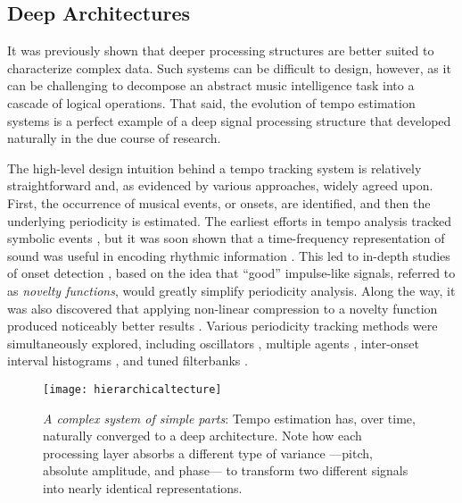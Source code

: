 \subsection{Deep Architectures}
\label{subsec:deep_architectures}

It was previously shown that deeper processing structures are better suited to characterize complex data.
Such systems can be difficult to design, however, as it can be challenging to decompose an abstract music intelligence task into a cascade of logical operations.
That said, the evolution of tempo estimation systems is a perfect example of a deep signal processing structure that developed naturally in the due course of research.

The high-level design intuition behind a tempo tracking system is relatively straightforward and, as evidenced by various approaches, widely agreed upon.
First, the occurrence of musical events, or onsets, are identified, and then the underlying periodicity is estimated.
The earliest efforts in tempo analysis tracked symbolic events \cite{Dannenberg1984}, but it was soon shown that a time-frequency representation of sound was useful in encoding rhythmic information \cite{Scheirer1998}.
This led to in-depth studies of onset detection \cite{Bello2005}, based on the idea that ``good'' impulse-like signals, referred to as \emph{novelty functions}, would greatly simplify periodicity analysis.
Along the way, it was also discovered that applying non-linear compression to a novelty function produced noticeably better results \cite{Klapuri2006}.
Various periodicity tracking methods were simultaneously explored, including oscillators \cite{Large1994}, multiple agents \cite{Goto1995}, inter-onset interval histograms \cite{Dixon2007}, and tuned filterbanks \cite{Grosche2011}.

\begin{figure}
\begin{centering}
\texttt{[image: hierarchicaltecture]}
\caption{\emph{A complex system of simple parts}: Tempo estimation has, over time, naturally converged to a deep architecture. Note how each processing layer absorbs a different type of variance ---pitch, absolute amplitude, and phase--- to transform two different signals into nearly identical representations.}
\label{fig:hierarchicaltecture}
\end{centering}
\end{figure}

